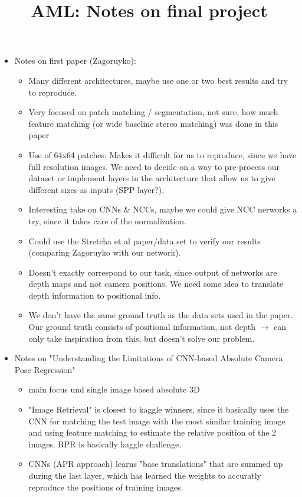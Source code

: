\documentclass{article}
\begin{document}
\title{\textbf{AML: Notes on final project}}

\maketitle
\large

\begin{itemize}
\item Notes on first paper (Zagoruyko):

\begin{itemize}
\item Many different architectures, maybe use one or two best results and try to reproduce.
\item Very focused on patch matching / segmentation, not sure, how much feature matching (or wide baseline stereo matching) was done in this paper
\item Use of 64x64 patches: Makes it difficult for us to reproduce, since we have full resolution images. We need to decide on a way to pre-process our dataset or implement layers in the architecture that allow us to give different sizes as inputs (SPP layer?).
\item Interesting take on CNNs \& NCCs, maybe we could give NCC nerworks a try, since it takes care of the normalization.
\item Could use the Stretcha et al paper/data set to verify our results (comparing Zagoruyko with our network).
\item Doesn't exactly correspond to our task, since output of networks are depth maps and not camera positions. We need some idea to translate depth information to positional info.
\item We don't have the same ground truth as the data sets used in the paper. Our ground truth consists of positional information, not depth $\rightarrow$ can only take inspiration from this, but doesn't solve our problem.
\end{itemize}

\item Notes on "Understanding the Limitations of CNN-based Absolute Camera Pose Regression"
\begin{itemize}
\item main focus und single image based absolute 3D
\item "Image Retrieval" is closest to kaggle winners, since it basically uses the CNN for matching the test image with the most similar training image and using feature matching to estimate the relative position of the 2 images. RPR is basically kaggle challenge.
\item CNNs (APR approach) learns "base translations" that are summed up during the last layer, which has learned the weights to accuratly reproduce the positions of training images.
\end{itemize}




\end{itemize}
\end{document}
